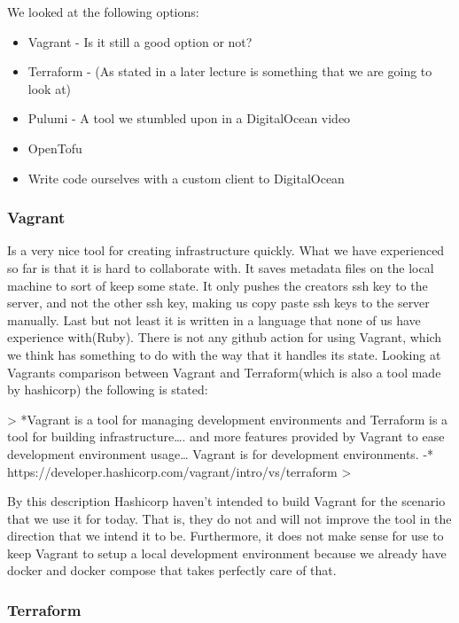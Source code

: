 We looked at the following options:

\begin{itemize}
    \item Vagrant - Is it still a good option or not?
    \item Terraform - (As stated in a later lecture is something that we are going to look at)
    \item Pulumi - A tool we stumbled upon in a DigitalOcean video
    \item OpenTofu
    \item Write code ourselves with a custom client to DigitalOcean
\end{itemize}

\subsubsection{Vagrant}

Is a very nice tool for creating infrastructure quickly. What we have experienced so far is that it is hard to collaborate with. It saves metadata files on the local machine to sort of keep some state. It only pushes the creators ssh key to the server, and not the other ssh key, making us copy paste ssh keys to the server manually. Last but not least it is written in a language that none of us have experience with(Ruby).
There is not any github action for using Vagrant, which we think has something to do with the way that it handles its state. Looking at Vagrants comparison between Vagrant and Terraform(which is also a tool made by hashicorp) the following is stated: 


> *Vagrant is a tool for managing development environments and Terraform is a tool for building infrastructure…. and more features provided by Vagrant to ease development environment usage… Vagrant is for development environments.
-* https://developer.hashicorp.com/vagrant/intro/vs/terraform
> 

By this description Hashicorp haven’t intended to build Vagrant for the scenario that we use it for today. That is, they do not and will not improve the tool in the direction that we intend it to be. Furthermore, it does not make sense for use to keep Vagrant to setup a local development environment because we already have docker and docker compose that takes perfectly care of that.

\subsubsection{Terraform}

